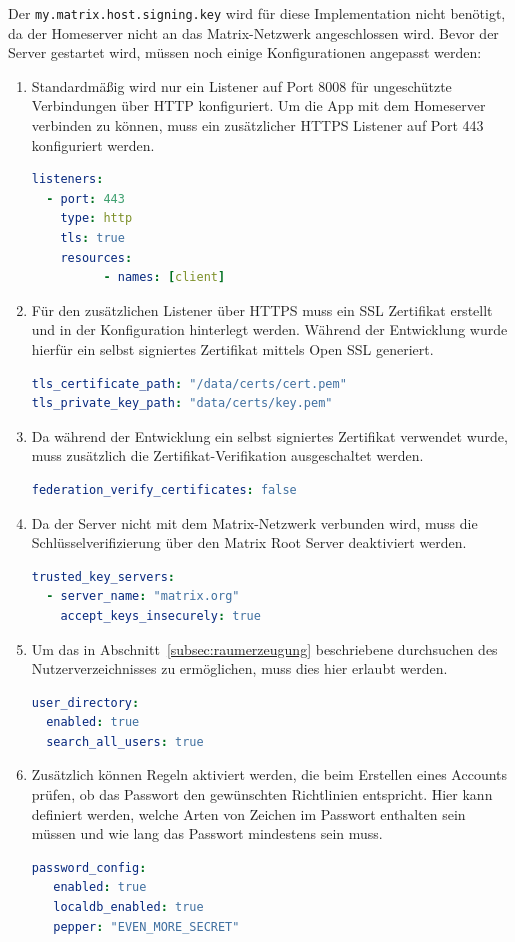     Der \texttt{my.matrix.host.signing.key} wird für diese Implementation nicht benötigt, da der Homeserver nicht an das Matrix-Netzwerk angeschlossen wird.
    Bevor der Server gestartet wird, müssen noch einige Konfigurationen angepasst werden:
    \begin{enumerate}[label={(\arabic*)}]
        \item Standardmäßig wird nur ein Listener auf Port 8008 für ungeschützte Verbindungen über HTTP konfiguriert.
            Um die App mit dem Homeserver verbinden zu können, muss ein zusätzlicher HTTPS Listener auf Port 443 konfiguriert werden.
        \begin{lstlisting}[language=yaml,label={lst:listener}]
listeners:
  - port: 443
    type: http
    tls: true
    resources:
          - names: [client]
            \end{lstlisting}
        \item Für den zusätzlichen Listener über HTTPS muss ein SSL Zertifikat erstellt und in der Konfiguration hinterlegt werden. Während der Entwicklung wurde hierfür ein selbst signiertes Zertifikat mittels Open SSL generiert.
            \begin{lstlisting}[language=yaml,label={lst:ssl-certificate}]
tls_certificate_path: "/data/certs/cert.pem"
tls_private_key_path: "data/certs/key.pem"
            \end{lstlisting}
        \item Da während der Entwicklung ein selbst signiertes Zertifikat verwendet wurde, muss zusätzlich die Zertifikat-Verifikation ausgeschaltet werden.
            \begin{lstlisting}[language=yaml,label={lst:disable-cert}]
federation_verify_certificates: false
            \end{lstlisting}
        \item Da der Server nicht mit dem Matrix-Netzwerk verbunden wird, muss die Schlüsselverifizierung über den Matrix Root Server deaktiviert werden.
            \begin{lstlisting}[language=yaml,label={lst:disable-key-verification}]
trusted_key_servers:
  - server_name: "matrix.org"
    accept_keys_insecurely: true
            \end{lstlisting}
        \item Um das in Abschnitt~\ref{subsec:raumerzeugung} beschriebene durchsuchen des Nutzerverzeichnisses zu ermöglichen, muss dies hier erlaubt werden.
            \begin{lstlisting}[language=yaml,label={lst:user-directory}]
user_directory:
  enabled: true
  search_all_users: true
            \end{lstlisting}
        \item Zusätzlich können Regeln aktiviert werden, die beim Erstellen eines Accounts prüfen, ob das Passwort den gewünschten Richtlinien entspricht.
                Hier kann definiert werden, welche Arten von Zeichen im Passwort enthalten sein müssen und wie lang das Passwort mindestens sein muss.
            \begin{lstlisting}[language=yaml,label={lst:password-policy}]
password_config:
   enabled: true
   localdb_enabled: true
   pepper: "EVEN_MORE_SECRET"


\end{lstlisting}
\end{enumerate}

